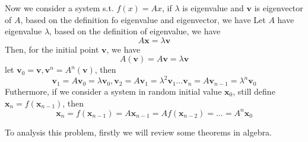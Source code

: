 \documentclass[12pt]{article}
\theoremstyle{plain}
\begin{document}
Now we consider a system s.t. $f(x) = Ax$, if $\lambda$ is eigenvalue and $\mathbf v$ is eigenvector of $A$, based on the definition fo eigenvalue and eigenvector, we have
Let $A$ have eigenvalue $\lambda$, based on the definition of eigenvalue, we have
$$
A\mathbf x = \lambda \mathbf v
$$
Then, for the initial point $\mathbf v$, we have
$$
A(\mathbf v) = A \mathbf v = \lambda \mathbf v
$$
let $\mathbf v_0 = \mathbf v, \mathbf v^n = A^n(\mathbf v)$, then
$$
\mathbf v_1 = A \mathbf v_0 = \lambda\mathbf v_0, \mathbf v_2 = A \mathbf v_1 = \lambda^2\mathbf v_1 \ldots \mathbf v_n = A \mathbf v_{n-1} = \lambda^{n}\mathbf v_0
$$
Futhermore, if we consider a system in random initial value $\mathbf x_0$, still define $\mathbf x_n = f(\mathbf x_{n-1})$, then 
$$
\mathbf x_n = f(\mathbf x_{n-1}) = A\mathbf x_{n-1} = Af(\mathbf x_{n-2}) = \ldots = A^n \mathbf x_0
$$





To analysis this problem, firstly we will review some theorems in algebra.
\end{document}
